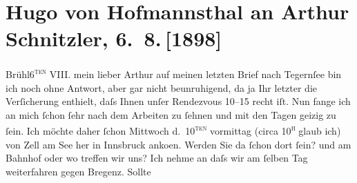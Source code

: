 

         \renewcommand{\erwaehnteOrte}{Orte: Bad Fusch, Bregenz, Hauptbahnhof, Hinterbrühl, Innsbruck, Salesianergasse, Tegernsee, Wien, Zell am See}
         \renewcommand{\erwaehnteWerke}{}
               \section[Hugo von Hofmannsthal an Arthur Schnitzler, 6. 8. {[}1898{]}]{ Hugo von Hofmannsthal an Arthur Schnitzler, 6. 8. {[}1898{]}}\nopagebreak{}\rehead{ }\begin{ledgroupsized}[t]{13cm}\normalsize\beginnumbering \toendnotes[C]{\smallbreak\pagebreak[2]} 
\toendnotes[C]{\smallbreak}\pstart
           \raggedleft{}{\pb}Brühl6\textsc{\textsuperscript{ten}} VIII.\pend
           \pstart{}mein lieber Arthur\pend\pstart
           auf meinen letzten Brief \introOben{}nach Tegernſee\introOben{} bin ich noch ohne Antwort, aber gar nicht beunruhigend, da ja Ihr letzter die
               Verſicherung enthielt, daſs Ihnen unſer Rendezvous 10–15
               recht iſt. Nun fange ich an mich ſchon ſehr nach dem Arbeiten zu ſehnen und mit den
               Tagen geizig zu ſein.\pend
           \pstart
           {\pb}Ich möchte daher ſchon
                  Mittwoch d. 10\textsc{\textsuperscript{ten}} vormittag (circa 10\textsc{\textsuperscript{h}} glaub ich) von Zell am See her in Innsbruck anko{\geminationm}en.
               Werden Sie da ſchon dort ſein? und am Bahnhof oder wo treffen wir uns? Ich nehme an daſs wir am
               ſelben Tag weiterfahren gegen Bregenz. Sollte

\end{ledgroupsized}
